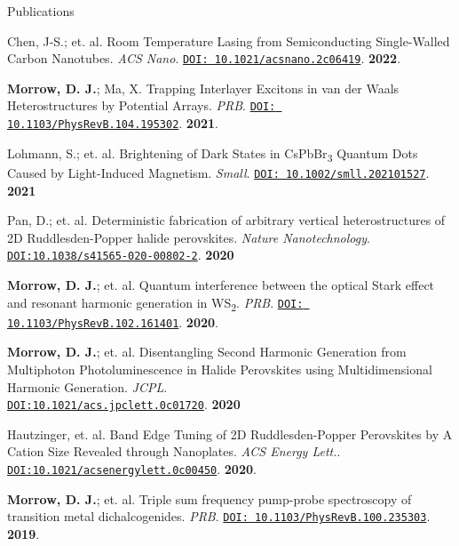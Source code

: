 \documentclass{resume} %
\begin{document}
\begin{rSection}{Publications}
\begin{etaremune}[topsep=0pt,itemsep=0pt,partopsep=0pt,parsep=0pt]
\item Chen, J-S.; et. al. Room Temperature Lasing from Semiconducting Single-Walled Carbon Nanotubes. \emph{ACS Nano}. \href{https://doi.org/10.1021/acsnano.2c06419}{\texttt{DOI: 10.1021/acsnano.2c06419}}. \textbf{2022}.

\item \textbf{Morrow, D. J.}; Ma, X. Trapping Interlayer Excitons in van der Waals Heterostructures by Potential Arrays.  \emph{PRB}. \href{https://journals.aps.org/prb/abstract/10.1103/PhysRevB.104.195302}{\texttt{DOI: 10.1103/PhysRevB.104.195302}}. \textbf{2021}.


\item Lohmann, S.;  et. al. Brightening of Dark States in CsPbBr\textsubscript{3} Quantum Dots Caused by Light-Induced Magnetism. \emph{Small}. \href{https://doi.org/10.1002/smll.202101527}{\texttt{DOI: 10.1002/smll.202101527}}. \textbf{2021}


\item  Pan, D.;  et. al. Deterministic fabrication of arbitrary vertical heterostructures of 2D Ruddlesden-Popper halide perovskites.  \emph{Nature Nanotechnology}. \href{https://doi.org/10.1038/s41565-020-00802-2}{\texttt{DOI:10.1038/s41565-020-00802-2}}. \textbf{2020}


\item \textbf{Morrow, D. J.}; et. al.	Quantum interference between the optical Stark effect and resonant harmonic generation in WS\textsubscript{2}.  \emph{PRB}. \href{https://journals.aps.org/pra/abstract/10.1103/PhysRevB.102.161401}{\texttt{DOI: 10.1103/PhysRevB.102.161401}}. \textbf{2020}.

\item \textbf{Morrow, D. J.}; et. al. Disentangling Second Harmonic Generation from Multiphoton Photoluminescence in Halide Perovskites using Multidimensional Harmonic Generation. \emph{JCPL}.\\ \href{https://pubs.acs.org/doi/10.1021/acs.jpclett.0c01720}{\texttt{DOI:10.1021/acs.jpclett.0c01720}}. \textbf{2020}

\item Hautzinger, et. al. Band Edge Tuning of 2D Ruddlesden-Popper Perovskites by A Cation Size Revealed through Nanoplates. \emph{ACS Energy Lett.}. \href{https://pubs.acs.org/doi/10.1021/acsenergylett.0c00450}{\texttt{DOI:10.1021/acsenergylett.0c00450}}. \textbf{2020}. 

\item  \textbf{Morrow, D. J.}; et. al. Triple sum frequency pump-probe spectroscopy of transition metal dichalcogenides. \emph{PRB}. \href{https://journals.aps.org/pra/abstract/10.1103/PhysRevB.100.235303}{\texttt{DOI: 10.1103/PhysRevB.100.235303}}. \textbf{2019}.


\end{etaremune}
\end{rSection}
\end{document}
